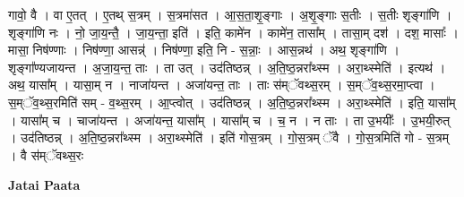 \documentclass[17pt]{extarticle}
\begin{document}
गावो॒ वै । वा ए॒तत् । ए॒तथ् स॒त्रम् । स॒त्रमा॑सत । आ॒स॒ता॒शृ॒ङ्‍गाः । अ॒शृ॒ङ्‍गाः स॒तीः । स॒तीः शृङ्‍गा॑णि । शृङ्‍गा॑णि नः । नो॒ जा॒य॒न्तै॒ । जा॒य॒न्ता॒ इति॑ । इति॒ कामे॑न । कामे॑न॒ तासा᳚म् । तासा॒म् दश॑ । दश॒ मासाः᳚ । मासा॒ निष॑ण्णाः । निष॑ण्णा॒ आसन्न्॑ । निष॑ण्णा॒ इति॒ नि - स॒न्नाः॒ । आस॒न्नथ॑ । अथ॒ शृङ्‍गा॑णि । शृङ्गा᳚ण्यजायन्त । अ॒जा॒य॒न्त॒ ताः । ता उत् । उद॑तिष्ठन्न् । अ॒ति॒ष्ठ॒न्नरा᳚थ्स्म । अरा॒थ्स्मेति॑ । इत्यथ॑ । अथ॒ यासा᳚म् । यासा॒म् न । नाजा॑यन्त । अजा॑यन्त॒ ताः । ताः स॑म्ॅवथ्स॒रम् । स॒म्ॅव॒थ्स॒रमा॒प्त्वा । स॒म्ॅव॒थ्स॒रमिति॑ सम् - व॒थ्स॒रम् । आ॒प्त्वोत् । उद॑तिष्ठन्न् । अ॒ति॒ष्ठ॒न्नरा᳚थ्स्म । अरा॒थ्स्मेति॑ । इति॒ यासा᳚म् । यासा᳚म् च । चाजा॑यन्त । अजा॑यन्त॒ यासा᳚म् । यासा᳚म् च । च॒ न । न ताः । ता उ॒भयीः᳚ । उ॒भयी॒रुत् । उद॑तिष्ठन्न् । अ॒ति॒ष्ठ॒न्नरा᳚थ्स्म । अरा॒थ्स्मेति॑ । इति॑ गोस॒त्रम् । गो॒स॒त्रम् ॅवै । गो॒स॒त्रमिति॑ गो - स॒त्रम् । वै स॑म्ॅवथ्स॒रः \newline

\textbf{Jatai Paata} \newline
\end{document}

